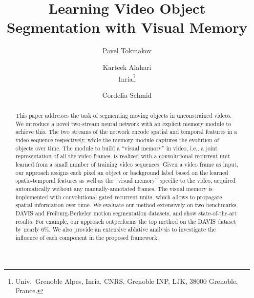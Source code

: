 \documentclass[10pt,twocolumn,letterpaper]{article}
\begin{document}
\newcommand{\sixfiguresdots}[7]{
            \centerline{{\texttt{[image: \#1]}}~~{\texttt{[image: \#2]}}~~{\texttt{[image: \#3]}}~~{...}~~{\texttt{[image: \#4]}}~~{\texttt{[image: \#5]}}~~{\texttt{[image: \#6]}}}}            


\newcommand{\threefigurescaption}[7]{
            \centerline{{\texttt{[image: \#1]}}~~{\texttt{[image: \#2]}}~~{\texttt{[image: \#3]}}}
		     \makebox[#4][c]{#5}\makebox[#4][c]{#6}\makebox[#4][c]{#7}}

\newcommand{\comment}[1]{}

\newcommand{\twofigurescaption}[6]{
            \centerline{{\texttt{[image: \#1]}}~~{\texttt{[image: \#2]}}}
            \makebox[#6][c]{#4}\makebox[#6][c]{#5}}

\newcommand{\todo}[1]{{\bf TODO:} #1}

 \graphicspath{{figs/}}

\title{Learning Video Object Segmentation with Visual Memory}

\author{Pavel Tokmakov
\and
Karteek Alahari\vspace{0.3cm}\\
\large{Inria\thanks{Univ.\ Grenoble Alpes, Inria, CNRS, Grenoble INP, LJK, 38000 Grenoble, France.}\vspace{-0.2cm}}
\and
Cordelia Schmid\\
}

\maketitle


\begin{abstract}
This paper addresses the task of segmenting moving objects in unconstrained
videos. We introduce a novel two-stream neural network with an explicit memory
module to achieve this. The two streams of the network encode spatial and
temporal features in a video sequence respectively, while the memory module
captures the evolution of objects over time. The module to build a ``visual
memory'' in video, i.e., a joint representation of all the video frames, is
realized with a convolutional recurrent unit learned from a small number of
training video sequences. Given a video frame as input, our approach assigns
each pixel an object or background label based on the learned spatio-temporal
features as well as the ``visual memory'' specific to the video, acquired
automatically without any manually-annotated frames. The visual memory is
implemented with convolutional gated recurrent units, which allows to propagate
spatial information over time. We evaluate our method extensively on two
benchmarks, DAVIS and Freiburg-Berkeley motion segmentation datasets, and show
state-of-the-art results. For example, our approach outperforms the top method
on the DAVIS dataset by nearly 6\%. We also provide an extensive ablative
analysis to investigate the influence of each component in the proposed
framework.
\end{abstract}
\end{document}
